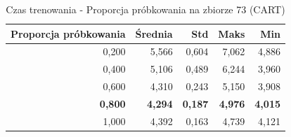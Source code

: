 \begin{table}[htbp]
\centering
\small
\setlength{\tabcolsep}{6pt}
\renewcommand{\arraystretch}{1.2}
\caption{Czas trenowania - Proporcja próbkowania na zbiorze 73 (CART)}
\label{tab:CART_sample_ratio_73_time}
\begin{tabular}{r|r|r|r|r}
\toprule
Proporcja próbkowania & Średnia & Std & Maks & Min \\
\hline
0,200 & 5,566 & 0,604 & 7,062 & 4,886 \\
0,400 & 5,106 & 0,489 & 6,244 & 3,960 \\
0,600 & 4,310 & 0,243 & 5,150 & 3,908 \\
\textbf{0,800} & \textbf{4,294} & \textbf{0,187} & \textbf{4,976} & \textbf{4,015} \\
1,000 & 4,392 & 0,163 & 4,739 & 4,121 \\
\bottomrule
\end{tabular}
\end{table}